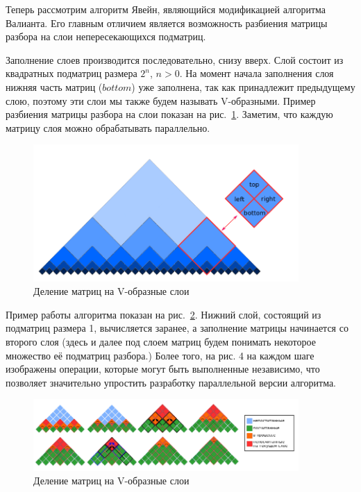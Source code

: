 Теперь рассмотрим алгоритм Явейн, являющийся модификацией алгоритма Валианта. Его главным отличием является возможность разбиения матрицы разбора на слои непересекающихся подматриц.

Заполнение слоев производится последовательно, снизу вверх. Слой состоит из квадратных подматриц размера $2^n$, $n > 0$. На момент начала заполнения слоя нижняя часть матриц ($bottom$) уже заполнена, так как принадлежит предыдущему слою, поэтому эти слои мы также будем называть V-образными. Пример разбиения матрицы разбора на слои показан на рис.~\ref{fig2}. Заметим, что каждую матрицу слоя можно обрабатывать параллельно.


\begin{figure}
\vspace{3mm}
 \begin{center}
    \centering
    \includegraphics[width=0.9\textwidth]{Susanina/pics/layers.png}
    \caption{Деление матриц на V-образные слои}
    \label{fig2}
 \end{center}
\vspace{-8mm}
\end{figure}

Пример работы алгоритма показан на рис.~\ref{modvis}. Нижний слой, состоящий из подматриц размера 1, вычисляется заранее, а заполнение матрицы начинается со второго слоя (здесь и далее под слоем матриц будем понимать некоторое множество её подматриц разбора.) Более того, на рис. 4 на каждом шаге изображены операции, которые могут быть выполненные независимо, что позволяет значительно упростить разработку параллельной версии алгоритма.

\begin{figure}[h]
\vspace{3mm}
 \begin{center}
    \centering
    \includegraphics[width=0.9\textwidth]{Susanina/pics/modivis2.png}
    \caption{Деление матриц на V-образные слои}
    \label{modvis}
 \end{center}
\vspace{-8mm}
\end{figure}

